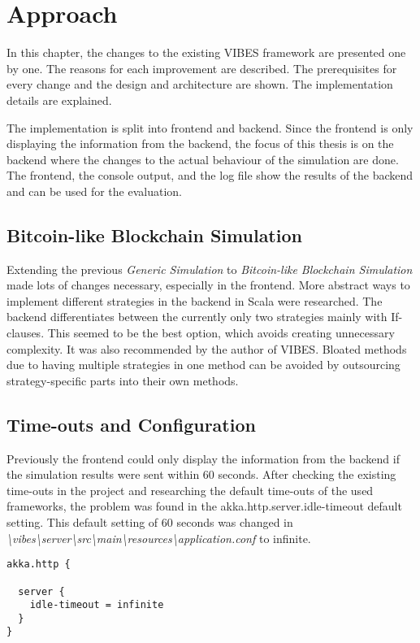 \chapter{Approach}\label{chapter:approach}
In this chapter, the changes to the existing VIBES framework are presented one by one. The reasons for each improvement are described. The prerequisites for every change and the design and architecture are shown. The implementation details are explained.

The implementation is split into frontend and backend. Since the frontend is only displaying the information from the backend, the focus of this thesis is on the backend where the changes to the actual behaviour of the simulation are done. The frontend, the console output, and the log file show the results of the backend and can be used for the evaluation.

\section{Bitcoin-like Blockchain Simulation}
Extending the previous \textit{Generic Simulation} to \textit{Bitcoin-like Blockchain Simulation} made lots of changes necessary, especially in the frontend. More abstract ways to implement different strategies in the backend in Scala were researched. The backend differentiates between the currently only two strategies mainly with If-clauses. This seemed to be the best option, which avoids creating unnecessary complexity. It was also recommended by the author of VIBES. Bloated methods due to having multiple strategies in one method can be avoided by outsourcing strategy-specific parts into their own methods.

\section{Time-outs and Configuration}
Previously the frontend could only display the information from the backend if the simulation results were sent within 60 seconds. After checking the existing time-outs in the project and researching the default time-outs of the used frameworks, the problem was found in the akka.http.server.idle-timeout default setting. This default setting of 60 seconds was changed in \textit{\textbackslash vibes\textbackslash server\textbackslash src\textbackslash main\textbackslash resources\textbackslash application.conf} to infinite.

\begin{minipage}{\linewidth}
\begin{lstlisting}[style=myScalastyle,label=lst:akkahttp,caption={application.conf}]
akka.http {

  server {
    idle-timeout = infinite
  }
}
\end{lstlisting}
\end{minipage}

